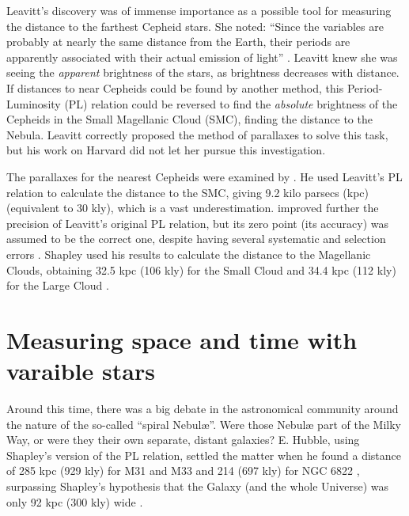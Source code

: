Leavitt's discovery was of immense importance as a possible tool for measuring the distance to the farthest Cepheid stars. 
She noted: \enquote{Since the variables are probably at nearly the same distance from the Earth,
their periods are apparently associated with their actual emission of light} \citep[page 3]{Leavitt1912}.
Leavitt knew she was seeing the \textit{apparent} brightness of the stars, as brightness decreases with distance.
If distances to near Cepheids could be found by another method, 
this Period-Luminosity (PL) relation could be reversed to find the \textit{absolute} brightness of the Cepheids in the Small Magellanic Cloud (SMC),
finding the distance to the Nebula.
Leavitt correctly proposed the method of parallaxes to solve this task, but his work on Harvard did not let her pursue this investigation.


The parallaxes for the nearest Cepheids were examined by \cite{Hertzsprung1913}.
He used Leavitt's PL relation to calculate the distance to the SMC, 
giving \citep[after a \enquote{pen error}, see][]{Fernie1969} 9.2 kilo parsecs (kpc) (equivalent to 30 kly), which is a vast underestimation.
\cite{Shapley1918} improved further the precision of Leavitt's original PL relation, 
but its zero point (its accuracy) was assumed to be the correct one, despite having several systematic and selection errors \citep{Fernie1969}.
Shapley used his results to calculate the distance to the Magellanic Clouds, 
obtaining 32.5 kpc (106 kly) for the Small Cloud \citep{Shapley1924S} and 34.4 kpc (112 kly) for the Large Cloud \citep{Shapley1924L}.

\section{Measuring space and time with varaible stars}


Around this time, there was a big debate in the astronomical community around the nature of the so-called \enquote{spiral Nebul\ae{}}.
Were those Nebul\ae{} part of the Milky Way, or were they their own separate, distant galaxies?
E. Hubble, using Shapley's version of the PL relation, settled the matter when he found a distance of 285 kpc (929 kly) for M31 and M33 
\citep[now called the Andromeda and Triangulum galaxies,][]{Hubble1925a}
and 214 (697 kly) for NGC 6822 \citep[Barnard's galaxy,][]{Hubble1925b}, 
surpassing Shapley's hypothesis that the Galaxy (and the whole Universe) was only 92 kpc (300 kly) wide \citep{ShapleyCurtis1921}.

